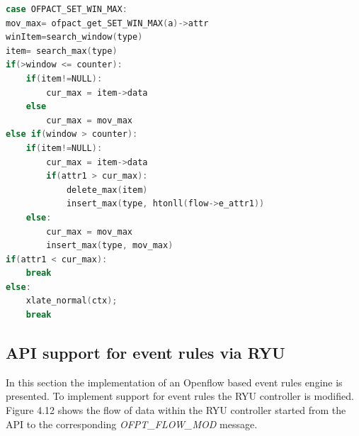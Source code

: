 \begin{itemize}
\begin{lstlisting}[language=c]
case OFPACT_SET_WIN_MAX:
mov_max= ofpact_get_SET_WIN_MAX(a)->attr 
winItem=search_window(type)
item= search_max(type)
if(>window <= counter):
	if(item!=NULL):
		cur_max = item->data 
	else
		cur_max = mov_max
else if(window > counter):
	if(item!=NULL):                     
		cur_max = item->data
		if(attr1 > cur_max):
			delete_max(item)
			insert_max(type, htonll(flow->e_attr1))	                    
	else:
		cur_max = mov_max
		insert_max(type, mov_max)
if(attr1 < cur_max): 
	break
else:
	xlate_normal(ctx);   
	break
\end{lstlisting}	
\end{itemize}

\subsection{API support for event rules via RYU}
In this section the implementation of an Openflow based event rules engine is presented. To implement support for event rules the RYU controller is modified. Figure 4.12 shows the flow of data within the RYU controller started from the API to the corresponding \textit{OFPT_FLOW_MOD} message. 

